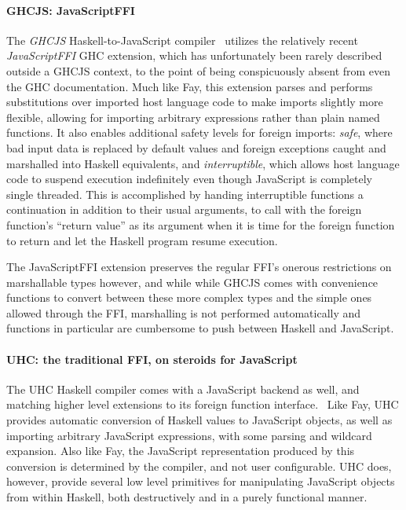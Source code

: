 \documentclass[preprint]{sigplanconf}
\begin{document}
\paragraph{GHCJS: JavaScriptFFI}
The \emph{GHCJS} Haskell-to-JavaScript compiler\ \cite{ghcjs} utilizes the
relatively recent \emph{JavaScriptFFI} GHC extension,
which has unfortunately been rarely described outside a GHCJS context, to the
point of being conspicuously absent from even the GHC documentation.
Much like Fay, this extension parses and
performs substitutions over imported host language code to make imports
slightly more flexible, allowing for importing arbitrary expressions rather
than plain named functions.
It also enables additional safety levels for foreign
imports: \emph{safe}, where bad input data is replaced by default values and
foreign exceptions caught and marshalled into Haskell equivalents,
and \emph{interruptible}, which allows host language code to suspend execution
indefinitely even though JavaScript is completely single threaded.
This is accomplished by handing interruptible functions a continuation in
addition to their usual arguments, to call with the foreign function's
``return value'' as its argument when it is time for the foreign function
to return and let the Haskell program resume execution.

The JavaScriptFFI extension preserves the regular FFI's onerous restrictions
on marshallable types however, and while while GHCJS comes with convenience
functions to convert between these more complex types and the simple ones
allowed through the FFI, marshalling is not performed automatically and
functions in particular are cumbersome to push between Haskell and JavaScript.

\paragraph{UHC: the traditional FFI, on steroids for JavaScript}
The UHC Haskell compiler comes with a JavaScript backend as well, and matching
higher level extensions to its foreign function interface.\ \cite{uhc}
Like Fay, UHC provides automatic conversion of Haskell values to JavaScript
objects, as well as importing arbitrary JavaScript expressions, with some
parsing and wildcard expansion.
Also like Fay, the JavaScript representation produced by this
conversion is determined by the compiler, and not user configurable.
UHC does, however, provide several low level primitives for manipulating
JavaScript objects from within Haskell, both destructively and in a purely
functional manner.
\end{document}
